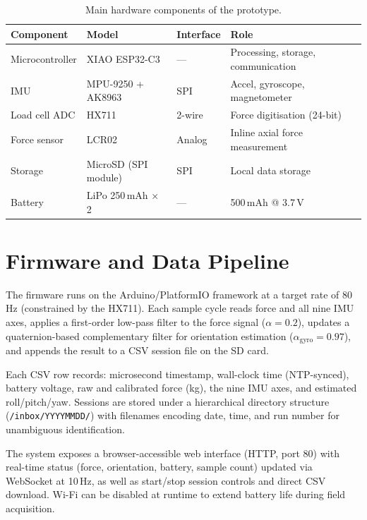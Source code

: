 \begin{table}[h]
  \centering
  \caption{Main hardware components of the prototype.}
  \label{tab:hw_components}
  \begin{tabular}{llll}
    \toprule
    \textbf{Component} & \textbf{Model} & \textbf{Interface} & \textbf{Role} \\
    \midrule
    Microcontroller     & XIAO ESP32-C3        & ---    & Processing, storage, communication \\
    IMU                 & MPU-9250 + AK8963    & SPI    & Accel, gyroscope, magnetometer \\
    Load cell ADC       & HX711                & 2-wire & Force digitisation (24-bit) \\
    Force sensor        & LCR02                & Analog & Inline axial force measurement \\
    Storage             & MicroSD (SPI module) & SPI    & Local data storage \\
    Battery             & LiPo 250\,mAh × 2   & ---    & 500\,mAh @ 3.7\,V \\
    \bottomrule
  \end{tabular}
\end{table}

\section{Firmware and Data Pipeline}
\label{section:firmware}

The firmware runs on the Arduino/PlatformIO framework at a target rate of
80\,Hz (constrained by the HX711).
Each sample cycle reads force and all nine IMU axes, applies a first-order
low-pass filter to the force signal ($\alpha=0.2$), updates a
quaternion-based complementary filter for orientation estimation
($\alpha_\text{gyro}=0.97$), and appends the result to a CSV session file
on the SD card.

Each CSV row records: microsecond timestamp, wall-clock time (NTP-synced),
battery voltage, raw and calibrated force (kg), the nine IMU axes, and
estimated roll/pitch/yaw.
Sessions are stored under a hierarchical directory structure
(\texttt{/inbox/YYYYMMDD/}) with filenames encoding date, time, and run
number for unambiguous identification.

The system exposes a browser-accessible web interface (HTTP, port 80) with
real-time status (force, orientation, battery, sample count) updated via
WebSocket at 10\,Hz, as well as start/stop session controls and direct CSV
download.
Wi-Fi can be disabled at runtime to extend battery life during field
acquisition.

